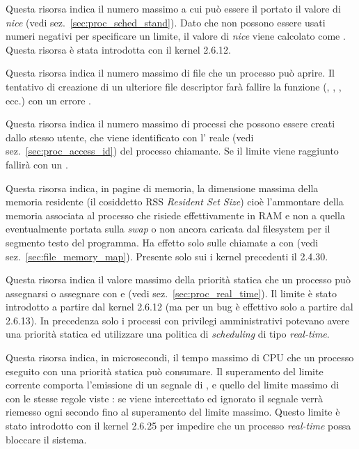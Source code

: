 \begin{basedescript}{\desclabelwidth{2.2cm}}
\item[\constd{RLIMIT\_NICE}] Questa risorsa indica il numero massimo a cui può
  essere il portato il valore di \textit{nice} (vedi
  sez.~\ref{sec:proc_sched_stand}). Dato che non possono essere usati numeri
  negativi per specificare un limite, il valore di \textit{nice} viene
  calcolato come . Questa risorsa è stata introdotta con il
  kernel 2.6.12.

\item[\constd{RLIMIT\_NOFILE}] Questa risorsa indica il numero massimo di file
  che un processo può aprire. Il tentativo di creazione di un ulteriore file
  descriptor farà fallire la funzione (, , ,
  ecc.) con un errore .

\item[\constd{RLIMIT\_NPROC}] Questa risorsa indica il numero massimo di
  processi che possono essere creati dallo stesso utente, che viene
  identificato con l' reale (vedi sez.~\ref{sec:proc_access_id}) del
  processo chiamante. Se il limite viene raggiunto  fallirà con un
  .

\item[\constd{RLIMIT\_RSS}] Questa risorsa indica, in pagine di memoria, la
  dimensione massima della memoria residente (il cosiddetto RSS
   \textit{Resident Set Size}) cioè
  l'ammontare della memoria associata al processo che risiede effettivamente
  in RAM e non a quella eventualmente portata sulla \textit{swap} o non ancora
  caricata dal filesystem per il segmento testo del programma.  Ha effetto
  solo sulle chiamate a  con  (vedi
  sez.~\ref{sec:file_memory_map}). Presente solo sui i kernel precedenti il
  2.4.30.

\item[\constd{RLIMIT\_RTPRIO}] Questa risorsa indica il valore massimo della
  priorità statica che un processo può assegnarsi o assegnare con
   e  (vedi
  sez.~\ref{sec:proc_real_time}). Il limite è stato introdotto a partire dal
  kernel 2.6.12 (ma per un bug è effettivo solo a partire dal 2.6.13). In
  precedenza solo i processi con privilegi amministrativi potevano avere una
  priorità statica ed utilizzare una politica di \textit{scheduling} di tipo
  \textit{real-time}.

\item[\constd{RLIMIT\_RTTIME}] Questa risorsa indica, in microsecondi, il tempo
  massimo di CPU che un processo eseguito con una priorità statica può
  consumare. Il superamento del limite corrente comporta l'emissione di un
  segnale di , e quello del limite massimo di 
  con le stesse regole viste : se  viene
  intercettato ed ignorato il segnale verrà riemesso ogni secondo fino al
  superamento del limite massimo. Questo limite è stato introdotto con il
  kernel 2.6.25 per impedire che un processo \textit{real-time} possa bloccare
  il sistema.


\end{basedescript}
